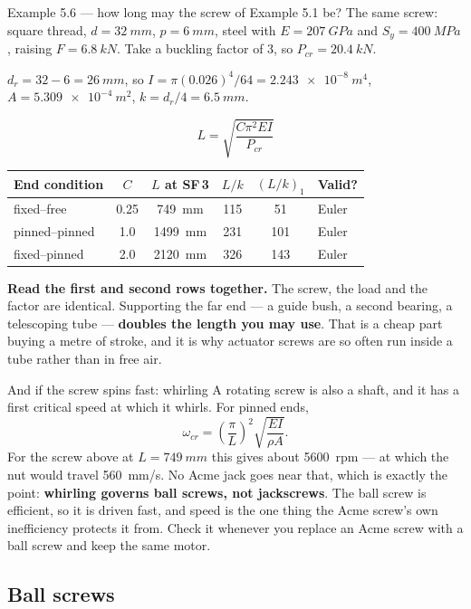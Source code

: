 \documentclass[11pt,a4paper]{article}
\begin{document}
\begin{examplebox}{Example 5.6 --- how long may the screw of Example 5.1 be?}
The same screw: square thread, $d=\SI{32}{mm}$, $p=\SI{6}{mm}$, steel with $E=\SI{207}{GPa}$ and
$S_y=\SI{400}{MPa}$, raising $F=\SI{6.8}{kN}$. Take a buckling factor of 3, so $P_{cr}=\SI{20.4}{kN}$.

\medskip
$d_r = 32-6 = \SI{26}{mm}$, so $I = \pi(0.026)^4/64 = \SI{2.243e-8}{m^4}$,
$A=\SI{5.309e-4}{m^2}$, $k = d_r/4 = \SI{6.5}{mm}$.

\[
L=\sqrt{\frac{C\pi^{2}EI}{P_{cr}}}
\]
\begin{center}\small
\begin{tabular}{@{}lccccl@{}}
\toprule
End condition & $C$ & $L$ at SF\,3 & $L/k$ & $(L/k)_1$ & Valid?\\
\midrule
fixed--free & 0.25 & \SI{749}{mm} & 115 & 51 & Euler\\
pinned--pinned & 1.0 & \SI{1499}{mm} & 231 & 101 & Euler\\
fixed--pinned & 2.0 & \SI{2120}{mm} & 326 & 143 & Euler\\
\bottomrule
\end{tabular}
\end{center}

\medskip
\textbf{Read the first and second rows together.} The screw, the load and the factor are identical.
Supporting the far end --- a guide bush, a second bearing, a telescoping tube --- \textbf{doubles the
length you may use}. That is a cheap part buying a metre of stroke, and it is why actuator screws
are so often run inside a tube rather than in free air.
\end{examplebox}

\begin{keybox}{And if the screw spins fast: whirling}
A rotating screw is also a shaft, and it has a first critical speed at which it whirls. For
pinned ends,
\[
\omega_{cr}=\left(\frac{\pi}{L}\right)^{2}\sqrt{\frac{EI}{\rho A}} .
\]
For the screw above at $L=\SI{749}{mm}$ this gives about \SI{5600}{rpm} --- at which the nut would
travel \SI{560}{mm/s}. No Acme jack goes near that, which is exactly the point: \textbf{whirling
governs ball screws, not jackscrews}. The ball screw is efficient, so it is driven fast, and speed is
the one thing the Acme screw's own inefficiency protects it from. Check it whenever you replace an
Acme screw with a ball screw and keep the same motor.
\end{keybox}

\subsection{Ball screws}
\end{document}
